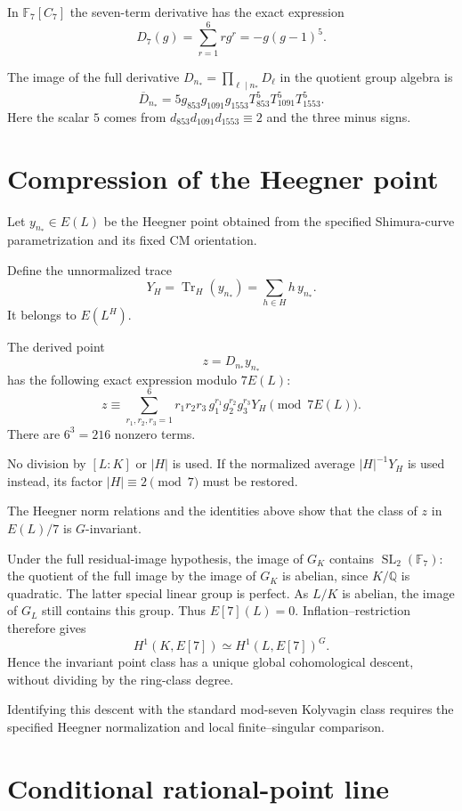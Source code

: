 \documentclass[11pt]{article}
\begin{document}
In $\mathbb F_7[C_7]$ the seven-term derivative
has the exact expression
\[
 D_7(g)=\sum_{r=1}^{6}rg^r
       =-g(g-1)^5.
\]

The image of the full derivative
$D_{n_*}=\prod_{\ell\mid n_*}D_\ell$
in the quotient group algebra is
\[
 \overline D_{n_*}
   =5g_{853}g_{1091}g_{1553}
     T_{853}^5T_{1091}^5T_{1553}^5.
\]
Here the scalar $5$ comes from
$d_{853}d_{1091}d_{1553}\equiv2$
and the three minus signs.

\section{Compression of the Heegner point}

Let $y_{n_*}\in E(L)$ be the Heegner point
obtained from the specified Shimura-curve
parametrization and its fixed CM orientation.

Define the unnormalized trace
\[
 Y_H=\operatorname{Tr}_H(y_{n_*})
       =\sum_{h\in H}h\,y_{n_*}.
\]
It belongs to $E(L^H)$.

The derived point
\[
 z=D_{n_*}y_{n_*}
\]
has the following exact expression modulo
$7E(L)$:
\[
 \boxed{
 z\equiv
 \sum_{r_1,r_2,r_3=1}^{6}
 r_1r_2r_3\,
 g_1^{r_1}g_2^{r_2}g_3^{r_3}Y_H
 \pmod{7E(L)}.
 }
\]
There are $6^3=216$ nonzero terms.

No division by $[L:K]$ or $|H|$ is used.
If the normalized average $|H|^{-1}Y_H$
is used instead, its factor
$|H|\equiv2\pmod7$ must be restored.

The Heegner norm relations and the identities
above show that the class of $z$ in $E(L)/7$
is $G$-invariant.

Under the full residual-image hypothesis, the image of $G_K$
contains $\operatorname{SL}_2(\mathbb F_7)$: the quotient of
the full image by the image of $G_K$ is abelian, since $K/\mathbb Q$
is quadratic. The latter special linear group is perfect. As $L/K$
is abelian, the image of $G_L$ still contains this group.
Thus $E[7](L)=0$. Inflation--restriction
therefore gives
\[
 H^1(K,E[7])
   \simeq H^1(L,E[7])^G.
\]
Hence the invariant point class has a unique
global cohomological descent, without
dividing by the ring-class degree.

Identifying this descent with the standard
mod-seven Kolyvagin class requires the
specified Heegner normalization and local
finite--singular comparison.

\section{Conditional rational-point line}
\end{document}

